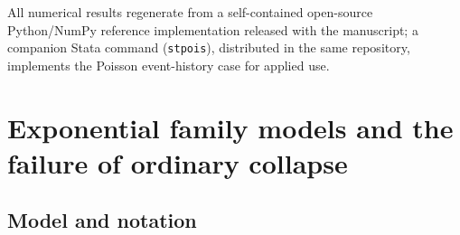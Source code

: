 \documentclass[11pt]{article}
\begin{document}
All numerical results regenerate from a self-contained open-source
Python/NumPy reference implementation released with the manuscript; a
companion Stata command (\texttt{stpois}), distributed in the same
repository, implements the Poisson event-history case for applied use.

\section{Exponential family models and the failure of ordinary
collapse}\label{sec:tilted}

\subsection{Model and notation}\label{sec:model}
\end{document}
